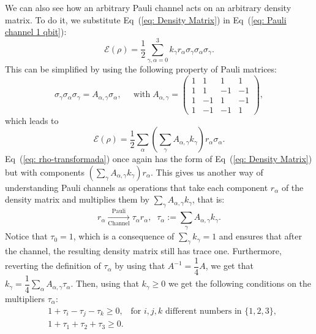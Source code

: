 \documentclass[10pt,letterpaper]{article} %
\newcommand{\eref}[1]{Eq~(\ref{#1})}
\begin{document}
We can also see how an arbitrary Pauli channel acts on an arbitrary  
density matrix.
To do it, we substitute \eref{eq: Density Matrix} 
in \eref{eq: Pauli channel 1 qbit}:
\begin{equation}
\mathcal{E}(\rho) = \dfrac{1}{2}\sum_{\gamma,\alpha=0}^3 k_{\gamma} r_{\alpha} \sigma_{\gamma} \sigma_{\alpha} \sigma_{\gamma}.
\end{equation}
This can be simplified by using the following property of Pauli matrices:
\begin{equation}
\label{eq: propiedad-pauli}
\sigma_{\gamma} \sigma_{\alpha} \sigma_{\gamma} = A_{\alpha,\gamma} \sigma_{\alpha}, \;\;\;\;\; \text{with} \; A_{\alpha,\gamma} = \begin{pmatrix}
1 & 1 & 1 & 1\\
1 & 1 & -1 &-1 \\
1 & -1 & 1 & -1 \\
1 & -1 & -1 & 1
\end{pmatrix},
\end{equation}
which leads to
\begin{equation}
\label{eq: rho-transformada}
\mathcal{E}(\rho) = \dfrac{1}{2} \sum_{\alpha} \left(\sum_{\gamma} A_{\alpha, \gamma} k_{\gamma} \right) r_{\alpha} \sigma_{\alpha}.
\end{equation}
\eref{eq: rho-transformada} once again has the form of \eref{eq: Density Matrix}
but with components $\left( \sum_{\gamma} A_{\alpha,\gamma} k_{\gamma} \right) r_{\alpha}$.
This gives us another way of understanding Pauli channels
as operations that take each component $r_{\alpha}$
of the density matrix and multiplies them
by $\sum_{\gamma} A_{\alpha,\gamma} k_{\gamma}$, 
that is:
\begin{equation}
\label{eq: multipliers}
r_{\alpha}  \xrightarrow[\text{Channel}]{\text{Pauli}}  \tau_{\alpha} r_{\alpha} ,\;\; \tau_{\alpha} := \sum_{\gamma} A_{\alpha,\gamma} k_{\gamma}.
\end{equation}
Notice that $\tau_0 = 1$, which is a consequence of $\sum_{\gamma}k_{\gamma}=1$
and ensures that after the channel, the resulting density matrix still has trace one. 
Furthermore, reverting the definition of $\tau_{\alpha}$ by using that $A^{-1} = \dfrac{1}{4} A$, 
we get that $k_{\gamma} = \dfrac{1}{4} \sum_{\alpha} A_{\alpha,\gamma} \tau_{\alpha}$.
Then, using that $k_{\gamma} \geq 0$
we get the following conditions on the multipliers $\tau_{\alpha}$:
\begin{eqnarray}
\label{eq: conditions-tetrahedron}
&1+\tau_i -\tau_j - \tau_k \geq 0,  \;\;\; \text{for $i,j,k$ different numbers in $\{1,2,3\}$}, \\
&1+\tau_1 + \tau_2 + \tau_3 \geq 0.
\end{eqnarray}
\end{document}
